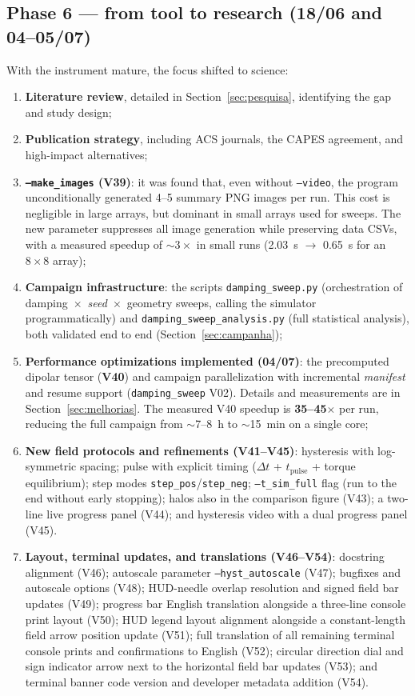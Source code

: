 \documentclass[11pt,a4paper]{article}
\newcommand{\code}[1]{\texttt{#1}}
\begin{document}
\subsection{Phase 6 --- from tool to research (18/06 and 04--05/07)}

With the instrument mature, the focus shifted to science:

\begin{enumerate}
\item \textbf{Literature review}, detailed in Section~\ref{sec:pesquisa}, identifying the gap and study design;
\item \textbf{Publication strategy}, including ACS journals, the CAPES agreement, and high-impact alternatives;
\item \textbf{\code{--make\_images} (V39)}: it was found that, even without \code{--video}, the program unconditionally generated 4--5 summary PNG images per run. This cost is negligible in large arrays, but dominant in small arrays used for sweeps. The new parameter suppresses all image generation while preserving data CSVs, with a measured speedup of $\sim 3\times$ in small runs (2.03~s $\to$ 0.65~s for an $8\times8$ array);
\item \textbf{Campaign infrastructure}: the scripts \code{damping\_sweep.py} (orchestration of damping~$\times$~\emph{seed}~$\times$~geometry sweeps, calling the simulator programmatically) and \code{damping\_sweep\_analysis.py} (full statistical analysis), both validated end to end (Section~\ref{sec:campanha});
\item \textbf{Performance optimizations implemented (04/07)}: the precomputed dipolar tensor (\textbf{V40}) and campaign parallelization with incremental \emph{manifest} and resume support (\code{damping\_sweep} V02). Details and measurements are in Section~\ref{sec:melhorias}. The measured V40 speedup is \textbf{35--45$\times$} per run, reducing the full campaign from $\sim$7--8~h to $\sim$15~min on a single core;
\item \textbf{New field protocols and refinements (V41--V45)}: hysteresis with log-symmetric spacing; pulse with explicit timing ($\Delta t$ + $t_{\mathrm{pulse}}$ + torque equilibrium); step modes \code{step\_pos}/\code{step\_neg}; \code{--t\_sim\_full} flag (run to the end without early stopping); halos also in the comparison figure (V43); a two-line live progress panel (V44); and hysteresis video with a dual progress panel (V45).
\item \textbf{Layout, terminal updates, and translations (V46--V54)}: docstring alignment (V46); autoscale parameter \code{--hyst\_autoscale} (V47); bugfixes and autoscale options (V48); HUD-needle overlap resolution and signed field bar updates (V49); progress bar English translation alongside a three-line console print layout (V50); HUD legend layout alignment alongside a constant-length field arrow position update (V51); full translation of all remaining terminal console prints and confirmations to English (V52); circular direction dial and sign indicator arrow next to the horizontal field bar updates (V53); and terminal banner code version and developer metadata addition (V54).
\end{enumerate}
\end{document}
